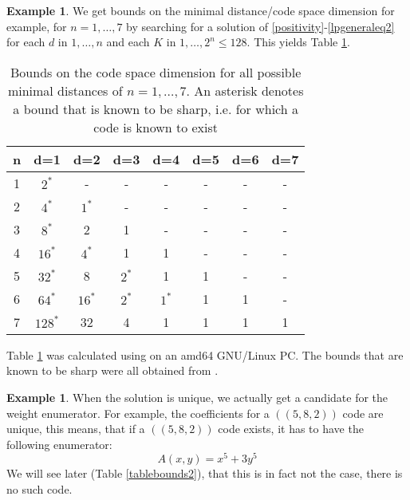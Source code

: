 \documentclass[12pt,a4paper,BCOR15mm,twoside,DIV12]{article}
\theoremstyle{definition}
\newtheorem{ex}[Satz]{Example}
\newtheorem{rem}[Satz]{Remark}
\begin{document}
\begin{ex}\label{exbounds1}
We get bounds on the minimal distance/code space dimension for example, for $n = 1, \ldots ,7$ by searching for a solution of \ref{positivity}-\ref{lpgeneraleq2} for each $d$ in $1, \ldots, n$ and each $K$ in $1,\ldots,2^n \leq 128$. This yields Table \ref{tablebounds1}.

\begin{table}[h]\label{tablebounds1}
\centering
\begin{tabular}{|c|c|c|c|c|c|c|c|}
\hline

n & d=1 & d=2 & d=3 & d=4 & d=5 & d=6 & d=7\\ \hline
1 & $2^*$ & - & - & - & - & - & - \\ \hline
2 & $4^*$ & $1^*$ & - & - & - & - & - \\ \hline
3 & $8^*$ & 2 & 1 & - & - & - & - \\ \hline
4 & $16^*$ & $4^*$ & 1 & 1 & - & - & - \\ \hline
5 & $32^*$ & 8 & $2^*$ & 1 & 1 & - & -  \\ \hline
6 & $64^*$ & $16^*$ & $2^*$ & $1^*$ & 1 &1 & - \\ \hline
7 & $128^*$ & 32  & 4 & 1 & 1 & 1& 1 \\ \hline 
\end{tabular}
\caption{Bounds on the code space dimension for all possible minimal distances of $n = 1,\ldots, 7$. An asterisk denotes a bound that is known to be sharp, i.e. for which a code is known to exist }
\end{table}
\end{ex}

Table \ref{tablebounds1} was calculated using \cite{maple} on an amd64 GNU/Linux PC. %
The bounds that are known to be sharp were all obtained from \cite{codetables}.


\begin{ex}\label{uniqueenum}
When the solution is unique, we actually get a candidate for the weight enumerator. For example, the coefficients for a $((5,8,2))$ code are unique, this means, that if a $((5,8,2))$ code exists, it has to have the following enumerator:
\begin{equation}
A(x,y) = x^5 + 3 y^5
\end{equation}
We will see later (Table \ref{tablebounds2}), that this is in fact not the case, there is no such code.
\end{ex}
\end{document}
